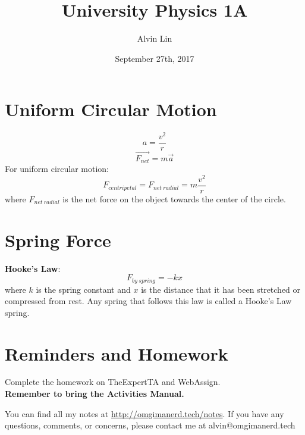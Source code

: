 \documentclass[letterpaper, 12pt]{math}
\title{University Physics 1A}
\author{Alvin Lin}
\date{September 27th, 2017}
\begin{document}
\maketitle

\section*{Uniform Circular Motion}
\begin{center}
\end{center}
\[ a = \frac{v^2}{r} \]
\[ \overrightarrow{F_{net}} = m\vec{a} \]
For uniform circular motion:
\[ F_{centripetal} = F_{net~radial} = m\frac{v^2}{r} \]
where \( F_{net~radial} \) is the net force on the object towards the center of
the circle.

\section*{Spring Force}
\textbf{Hooke's Law}:
\[ F_{by~spring} = -kx \]
where \( k \) is the spring constant and \( x \) is the distance that it has
been stretched or compressed from rest. Any spring that follows this law is
called a Hooke's Law spring.

\section*{Reminders and Homework}
Complete the homework on TheExpertTA and WebAssign. \\
\textbf{Remember to bring the Activities Manual.} \\

\begin{center}
  You can find all my notes at \url{http://omgimanerd.tech/notes}. If you have
  any questions, comments, or concerns, please contact me at
  alvin@omgimanerd.tech
\end{center}
\end{document}
